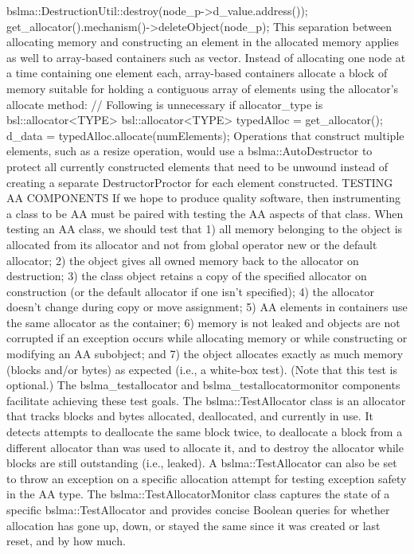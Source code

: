 {{{{{{{{{{        bslma::DestructionUtil::destroy(node_p->d_value.address());
        get_allocator().mechanism()->deleteObject(node_p);
    }
}
This separation between allocating memory and constructing an element in the allocated memory applies as well to array-based containers such as vector. Instead of allocating one node at a time containing one element each, array-based containers allocate a block of memory suitable for holding a contiguous array of elements using the allocator’s allocate method:
    // Following is unnecessary if allocator_type is bsl::allocator<TYPE>
    bsl::allocator<TYPE> typedAlloc = get_allocator();
    d_data = typedAlloc.allocate(numElements);
Operations that construct multiple elements, such as a resize operation, would use a bslma::AutoDestructor to protect all currently constructed elements that need to be unwound instead of creating a separate DestructorProctor for each element constructed. 
TESTING AA COMPONENTS
If we hope to produce quality software, then instrumenting a class to be AA must be paired with testing the AA aspects of that class.  When testing an AA class, we should test that
1)	all memory belonging to the object is allocated from its allocator and not from global operator new or the default allocator;
2)	the object gives all owned memory back to the allocator on destruction;
3)	the class object retains a copy of the specified allocator on construction (or the default allocator if one isn’t specified);
4)	the allocator doesn’t change during copy or move assignment;
5)	AA elements in containers use the same allocator as the container;
6)	memory is not leaked and objects are not corrupted if an exception occurs while allocating memory or while constructing or modifying an AA subobject; and
7)	the object allocates exactly as much memory (blocks and/or bytes) as expected (i.e., a white-box test). (Note that this test is optional.)
The bslma_testallocator and bslma_testallocatormonitor components facilitate achieving these test goals.  The bslma::TestAllocator class is an allocator that tracks blocks and bytes allocated, deallocated, and currently in use. It detects attempts to deallocate the same block twice, to deallocate a block from a different allocator than was used to allocate it, and to destroy the allocator while blocks are still outstanding (i.e., leaked). A bslma::TestAllocator can also be set to throw an exception on a specific allocation attempt for testing exception safety in the AA type. The bslma::TestAllocatorMonitor class captures the state of a specific bslma::TestAllocator and provides concise Boolean queries for whether allocation has gone up, down, or stayed the same since it was created or last reset, and by how much.
}}}}}}}}

